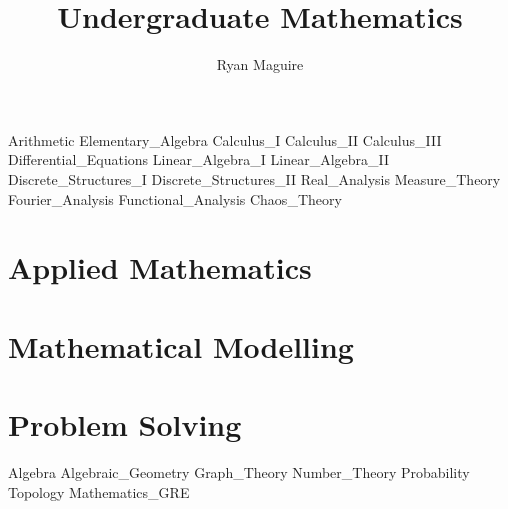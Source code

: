 \documentclass[crop=false,class=book,oneside]{standalone}
\begin{document}
    \newif\ifmathcourses
    \ifx\ifcourses\undefined
        \title{Undergraduate Mathematics}
        \author{Ryan Maguire}
        \date{\vspace{-5ex}}
        \maketitle
        \tableofcontents
        \listoffigures
        \listoftables
        \clearpage
    \fi
    {Arithmetic}
    {Elementary_Algebra}
    {Calculus_I}
    {Calculus_II}
    {Calculus_III}
    {Differential_Equations}
    {Linear_Algebra_I}
    {Linear_Algebra_II}
    {Discrete_Structures_I}
    {Discrete_Structures_II}
    {Real_Analysis}
    {Measure_Theory}
    {Fourier_Analysis}
    {Functional_Analysis}
    {Chaos_Theory}
    \chapter{Applied Mathematics}
    \chapter{Mathematical Modelling}
    \chapter{Problem Solving}
    {Algebra}
    {Algebraic_Geometry}
    {Graph_Theory}
    {Number_Theory}
    {Probability}
    {Topology}
    {Mathematics_GRE}
\end{document}
